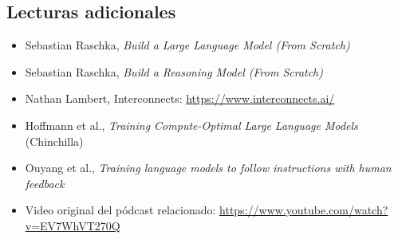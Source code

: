 \subsection{Lecturas adicionales}

\begin{itemize}[leftmargin=1.5em]
    \item Sebastian Raschka, \textit{Build a Large Language Model (From Scratch)}
    \item Sebastian Raschka, \textit{Build a Reasoning Model (From Scratch)}
    \item Nathan Lambert, Interconnects: \url{https://www.interconnects.ai/}
    \item Hoffmann et al., \textit{Training Compute-Optimal Large Language Models} (Chinchilla)
    \item Ouyang et al., \textit{Training language models to follow instructions with human feedback}
    \item Video original del pódcast relacionado: \url{https://www.youtube.com/watch?v=EV7WhVT270Q}
\end{itemize}


